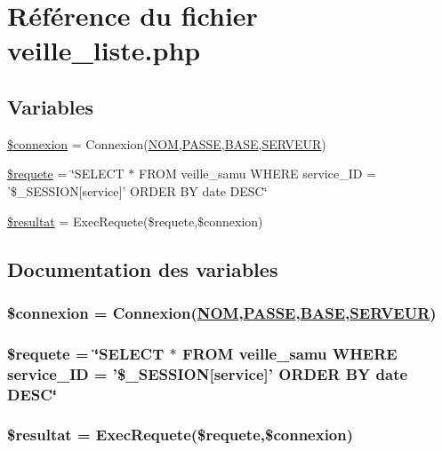 \hypertarget{veille__liste_8php}{
\section{R\'{e}f\'{e}rence du fichier veille\_\-liste.php}
\label{veille__liste_8php}
}
\subsection*{Variables}
\begin{CompactItemize}
\item 
\hyperlink{veille__liste_8php_a0}{\$connexion} = Connexion(\hyperlink{pma__connect_8php_a0}{NOM},\hyperlink{pma__connect_8php_a1}{PASSE},\hyperlink{pma__connect_8php_a3}{BASE},\hyperlink{pma__connect_8php_a2}{SERVEUR})
\item 
\hyperlink{veille__liste_8php_a1}{\$requete} = \char`\"{}SELECT $\ast$ FROM veille\_\-samu WHERE service\_\-ID = '\$\_\-SESSION\mbox{[}service\mbox{]}' ORDER BY date DESC\char`\"{}
\item 
\hyperlink{veille__liste_8php_a2}{\$resultat} = Exec\-Requete(\$requete,\$connexion)
\end{CompactItemize}


\subsection{Documentation des variables}
\hypertarget{veille__liste_8php_a0}{
\subsubsection[\$connexion]{\setlength{\rightskip}{0pt plus 5cm}\$connexion = Connexion(\hyperlink{pma__connect_8php_a0}{NOM},\hyperlink{pma__connect_8php_a1}{PASSE},\hyperlink{pma__connect_8php_a3}{BASE},\hyperlink{pma__connect_8php_a2}{SERVEUR})}}
\label{veille__liste_8php_a0}


\hypertarget{veille__liste_8php_a1}{
\subsubsection[\$requete]{\setlength{\rightskip}{0pt plus 5cm}\$requete = \char`\"{}SELECT $\ast$ FROM veille\_\-samu WHERE service\_\-ID = '\$\_\-SESSION\mbox{[}service\mbox{]}' ORDER BY date DESC\char`\"{}}}
\label{veille__liste_8php_a1}


\hypertarget{veille__liste_8php_a2}{
\subsubsection[\$resultat]{\setlength{\rightskip}{0pt plus 5cm}\$resultat = Exec\-Requete(\$requete,\$connexion)}}
\label{veille__liste_8php_a2}


